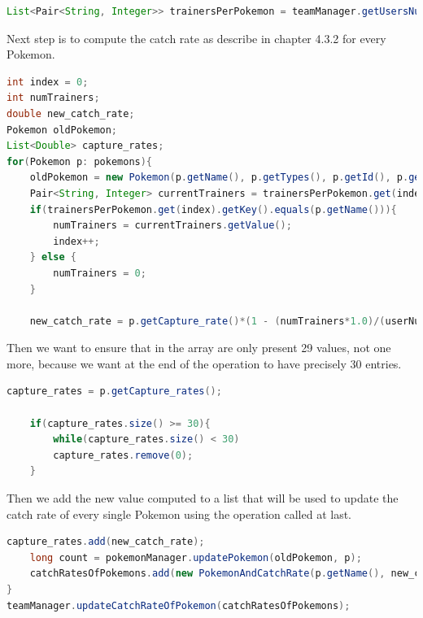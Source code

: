 \begin{lstlisting}[language=Java]
	List<Pair<String, Integer>> trainersPerPokemon = teamManager.getUsersNumberThatOwnsAPokemonNotFiltered();
\end{lstlisting}
Next step is to compute the catch rate as describe in chapter 4.3.2 for every Pokemon.

\begin{lstlisting}[language=Java]
int index = 0;
int numTrainers;
double new_catch_rate;
Pokemon oldPokemon;
List<Double> capture_rates;
for(Pokemon p: pokemons){
	oldPokemon = new Pokemon(p.getName(), p.getTypes(), p.getId(), p.getCapture_rate(), p.getCapture_rates(), (int)p.getHeight(), (int)p.getWeight(), p.getBiology(), p.getPortrait(), p.getSprite());
	Pair<String, Integer> currentTrainers = trainersPerPokemon.get(index);
	if(trainersPerPokemon.get(index).getKey().equals(p.getName())){
		numTrainers = currentTrainers.getValue();
		index++;
	} else {
		numTrainers = 0;
	}
	
	new_catch_rate = p.getCapture_rate()*(1 - (numTrainers*1.0)/(userNumber));

\end{lstlisting}

Then we want to ensure that in the array are only present 29 values, not one more, because we want at the end of the operation to have precisely 30 entries.

\begin{lstlisting}[language=Java]
	capture_rates = p.getCapture_rates();
	
	if(capture_rates.size() >= 30){
		while(capture_rates.size() < 30)
		capture_rates.remove(0);
	}
\end{lstlisting}
Then we add the new value computed to a list that will be used to update the catch rate of every single Pokemon using the operation called at last.
\begin{lstlisting}[language=Java]
	capture_rates.add(new_catch_rate);
	long count = pokemonManager.updatePokemon(oldPokemon, p);
	catchRatesOfPokemons.add(new PokemonAndCatchRate(p.getName(), new_catch_rate));
}
teamManager.updateCatchRateOfPokemon(catchRatesOfPokemons);
\end{lstlisting}



